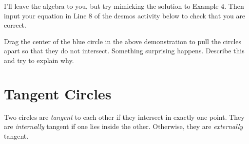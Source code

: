 \documentclass{ximera}
\begin{document}
\begin{explanation}
I'll leave the algebra to you, but try mimicking the solution to Example 4. Then input your equation in Line 8 of the desmos activity below to check that you are correct.

\begin{onlineOnly}
    \begin{center}
\end{center}
\end{onlineOnly}

\begin{question}
Drag the center of the blue circle in the above demonstration to pull the circles apart so that they do not intersect. Something surprising happens. Describe this and try to explain why.
\end{question}

\end{explanation}

\section*{Tangent Circles}
Two circles are \emph{tangent} to each other if they intersect in  exactly one point. They are \emph{internally} tangent if one lies inside the other. Otherwise, they are \emph{externally} tangent.
\end{document}

